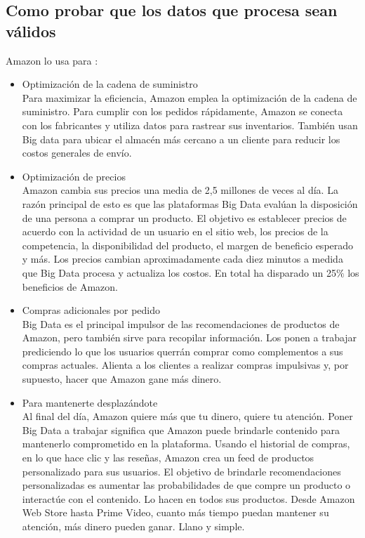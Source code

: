 \subsection{Como probar que los datos que procesa sean válidos}
Amazon lo usa para :
\begin{itemize}
  \item Optimización de la cadena de suministro \\
Para maximizar la eficiencia, Amazon emplea la optimización de la cadena de suministro. Para cumplir con los pedidos rápidamente, Amazon se conecta con los fabricantes y utiliza datos para rastrear sus inventarios. También usan Big data para ubicar el almacén más cercano a un cliente para reducir los costos generales de envío.
  \item Optimización de precios\\
Amazon cambia sus precios una media de 2,5 millones de veces al día. La razón principal de esto es que las plataformas Big Data evalúan la disposición de una persona a comprar un producto. El objetivo es establecer precios de acuerdo con la actividad de un usuario en el sitio web, los precios de la competencia, la disponibilidad del producto, el margen de beneficio esperado y más. Los precios cambian aproximadamente cada diez minutos a medida que Big Data procesa y actualiza los costos. En total ha disparado un 25$\%$ los beneficios de Amazon.
  \item Compras adicionales por pedido\\
Big Data es el principal impulsor de las recomendaciones de productos de Amazon, pero también sirve para recopilar información. Los ponen a trabajar prediciendo lo que los usuarios querrán comprar como complementos a sus compras actuales. Alienta a los clientes a realizar compras impulsivas y, por supuesto, hacer que Amazon gane más dinero.
  \item  Para mantenerte desplazándote\\
Al final del día, Amazon quiere más que tu dinero, quiere tu atención. Poner Big Data a trabajar significa que Amazon puede brindarle contenido para mantenerlo comprometido en la plataforma. Usando el historial de compras, en lo que hace clic y las reseñas, Amazon crea un feed de productos personalizado para sus usuarios. El objetivo de brindarle recomendaciones personalizadas es aumentar las probabilidades de que compre un producto o interactúe con el contenido. Lo hacen en todos sus productos. Desde Amazon Web Store hasta Prime Video, cuanto más tiempo puedan mantener su atención, más dinero pueden ganar. Llano y simple.
\end{itemize}
\clearpage
 